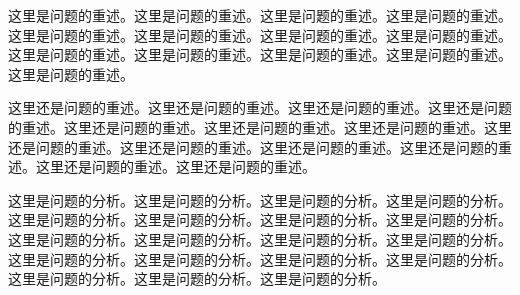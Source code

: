 \setcounter{page}{1}

%
%



这里是问题的重述。这里是问题的重述。这里是问题的重述。这里是问题的重述。这里是问题的重述。这里是问题的重述。这里是问题的重述。这里是问题的重述。这里是问题的重述。这里是问题的重述。这里是问题的重述。这里是问题的重述。这里是问题的重述。


这里还是问题的重述。这里还是问题的重述。这里还是问题的重述。这里还是问题的重述。这里还是问题的重述。这里还是问题的重述。这里还是问题的重述。这里还是问题的重述。这里还是问题的重述。这里还是问题的重述。这里还是问题的重述。这里还是问题的重述。这里还是问题的重述。

%
%



这里是问题的分析。这里是问题的分析。这里是问题的分析。这里是问题的分析。这里是问题的分析。这里是问题的分析。这里是问题的分析。这里是问题的分析。这里是问题的分析。这里是问题的分析。这里是问题的分析。这里是问题的分析。这里是问题的分析。这里是问题的分析。这里是问题的分析。这里是问题的分析。这里是问题的分析。这里是问题的分析。这里是问题的分析。
